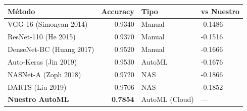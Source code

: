 \begin{tabular}{lrll}
\toprule
Método & Accuracy & Tipo & vs Nuestro \\
\midrule
VGG-16 (Simonyan 2014) & 0.9340 & Manual & -0.1486 \\
ResNet-110 (He 2015) & 0.9370 & Manual & -0.1516 \\
DenseNet-BC (Huang 2017) & 0.9520 & Manual & -0.1666 \\
Auto-Keras (Jin 2019) & 0.9530 & AutoML & -0.1676 \\
NASNet-A (Zoph 2018) & 0.9720 & NAS & -0.1866 \\
DARTS (Liu 2019) & 0.9706 & NAS & -0.1852 \\
\midrule
\textbf{Nuestro AutoML} & \textbf{0.7854} & AutoML (Cloud) & --- \\
\bottomrule
\end{tabular}